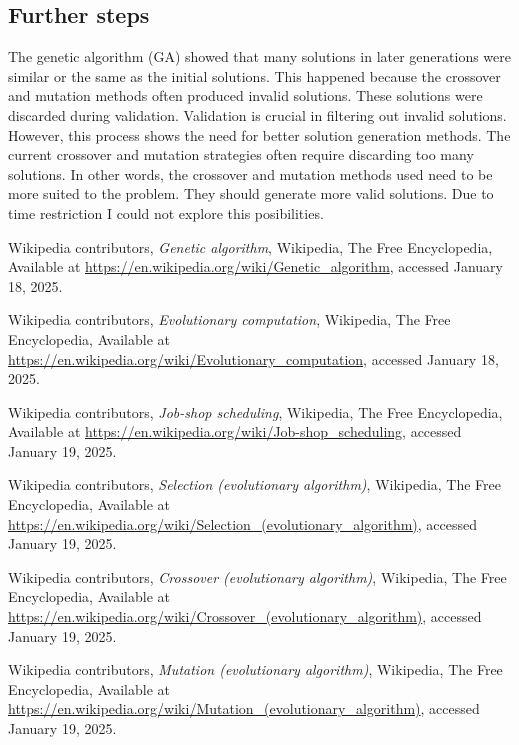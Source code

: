 \documentclass[11pt, a4paper]{article}
\begin{document}
\subsection{Further steps}

The genetic algorithm (GA) showed that many solutions in later generations were similar or the same as the initial solutions. This happened because the crossover and mutation methods often 
produced invalid solutions. These solutions were discarded during validation. Validation is crucial in filtering out invalid solutions. However, this process shows the need for better solution generation methods. 
The current crossover and mutation strategies often require discarding too many solutions. In other words, the crossover and mutation methods used need to be more suited to the problem. They should generate more 
valid solutions. Due to time restriction I could not explore this posibilities.

\newpage

\begin{thebibliography}{11}

Wikipedia contributors, \textit{Genetic algorithm}, Wikipedia, The Free Encyclopedia, 
Available at \url{https://en.wikipedia.org/wiki/Genetic\_algorithm}, 
accessed January 18, 2025.

Wikipedia contributors, \textit{Evolutionary computation}, Wikipedia, The Free Encyclopedia, 
Available at \url{https://en.wikipedia.org/wiki/Evolutionary_computation}, 
accessed January 18, 2025.

Wikipedia contributors, \textit{Job-shop scheduling}, Wikipedia, The Free Encyclopedia, 
Available at \url{https://en.wikipedia.org/wiki/Job-shop_scheduling}, 
accessed January 19, 2025.

Wikipedia contributors, \textit{Selection (evolutionary algorithm)}, Wikipedia, The Free Encyclopedia, 
Available at \url{https://en.wikipedia.org/wiki/Selection_(evolutionary_algorithm)}, 
accessed January 19, 2025.

Wikipedia contributors, \textit{Crossover (evolutionary algorithm)}, Wikipedia, The Free Encyclopedia, 
Available at \url{https://en.wikipedia.org/wiki/Crossover_(evolutionary_algorithm)}, 
accessed January 19, 2025.

Wikipedia contributors, \textit{Mutation (evolutionary algorithm)}, Wikipedia, The Free Encyclopedia, 
Available at \url{https://en.wikipedia.org/wiki/Mutation_(evolutionary_algorithm)}, 
accessed January 19, 2025.

\end{thebibliography}
\end{document}
